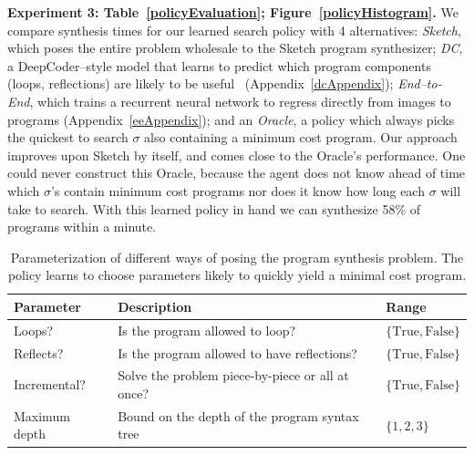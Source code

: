 \documentclass{article}
\theoremstyle{definition}
\begin{document}
\textbf{Experiment 3: Table~\ref{policyEvaluation}; Figure~\ref{policyHistogram}.}
We compare synthesis times for our learned search policy
with 4 alternatives:
 \emph{Sketch}, which poses the
 entire problem wholesale to the Sketch program synthesizer;
 \emph{DC}, a DeepCoder--style model that learns to predict which program components (loops, reflections)
 are likely to be useful~\cite{BalGauBroetal16} (Appendix~\ref{dcAppendix});
 \emph{End--to-End},
 which trains a recurrent neural network to regress directly from images to programs (Appendix~\ref{eeAppendix});
and an \emph{Oracle},
a policy which always picks the quickest to search $\sigma $
 also containing a minimum cost program.
Our approach improves upon Sketch by itself,
and comes close to the Oracle's performance.
One could never construct this Oracle,
because the agent does not know ahead of time which
$\sigma $'s contain minimum cost programs nor does it know how long each
$\sigma $ will take to search.
With this learned policy in hand we can synthesize 58\% of programs within a minute.
%
\begin{table}[h]\centering
  \caption{Parameterization of different ways of posing the program synthesis problem. The policy learns to choose parameters likely to quickly yield a minimal cost program.
  }\label{policyOutput}
  \begin{tabular}{lll}\toprule
  Parameter&Description&Range\\\midrule
  Loops?&Is the program allowed to loop?&$\{\text{True},\text{False}\}$\\
  Reflects?&Is the program allowed to have reflections?&$\{\text{True},\text{False}\}$\\
  Incremental?&Solve the problem piece-by-piece or all at once?&$\{\text{True},\text{False}\}$\\
  Maximum depth& Bound on the depth of the program syntax tree&$\{1,2,3\}$
  \\\bottomrule
  \end{tabular}\vspace{0.5cm}
  \end{table}
\end{document}
